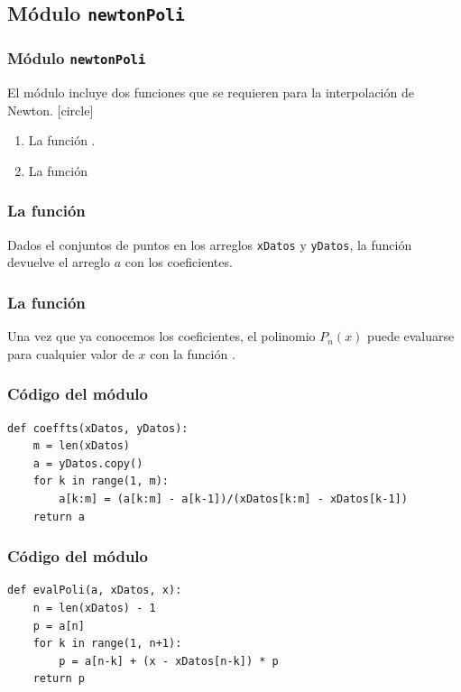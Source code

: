 \subsection{Módulo \texttt{newtonPoli}}
\begin{frame}
\frametitle{Módulo \texttt{newtonPoli}}
El módulo  incluye dos funciones que se requieren para la interpolación de Newton.
[circle]
\begin{enumerate}[<+->]
\item La función .
\item La función 
\end{enumerate}
\end{frame}
\begin{frame}
\frametitle{La función }
Dados el conjuntos de puntos en los arreglos \texttt{xDatos} y \texttt{yDatos}, la función  devuelve el arreglo $a$ con los coeficientes.
\end{frame}
\begin{frame}
\frametitle{La función }
Una vez que ya conocemos los coeficientes, el polinomio $P_{n}(x)$ puede evaluarse para cualquier valor de $x$ con la función .
\end{frame}
\begin{frame}[fragile]
\frametitle{Código del módulo}
\begin{lstlisting}[caption=Funciones \texttt{coeffts} del módulo \texttt{newtonPoli}, style=FormattedNumber, basicstyle=\linespread{0.9}\ttfamily=\small, columns=fullflexible]    
def coeffts(xDatos, yDatos):
    m = len(xDatos) 
    a = yDatos.copy()
    for k in range(1, m):
        a[k:m] = (a[k:m] - a[k-1])/(xDatos[k:m] - xDatos[k-1])
    return a
\end{lstlisting}
\end{frame}
\begin{frame}[fragile]
\frametitle{Código del módulo}
\begin{lstlisting}[caption=Funciones \texttt{evalPoli} del módulo \texttt{newtonPoli}, style=FormattedNumber, basicstyle=\linespread{0.9}\ttfamily=\small, columns=fullflexible]
def evalPoli(a, xDatos, x):
    n = len(xDatos) - 1 
    p = a[n]
    for k in range(1, n+1):
        p = a[n-k] + (x - xDatos[n-k]) * p
    return p
\end{lstlisting}
\end{frame}

